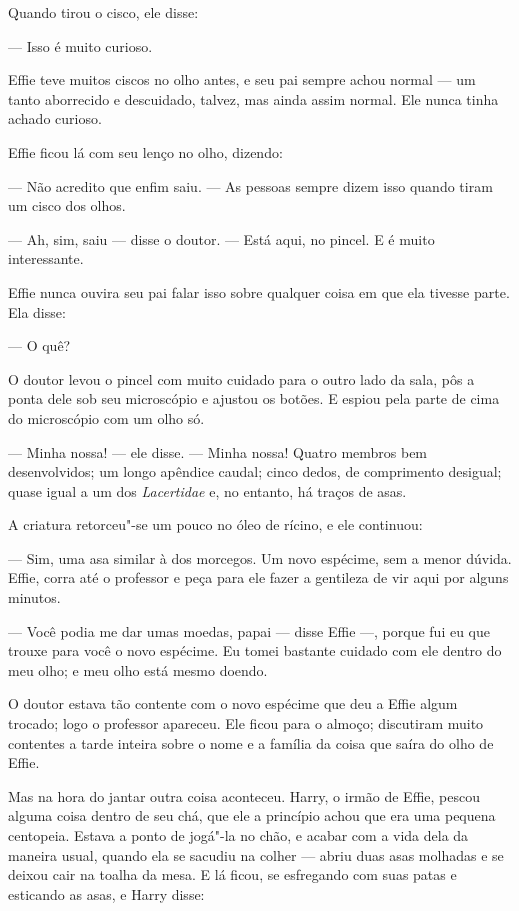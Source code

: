Quando tirou o cisco, ele disse:

--- Isso é muito curioso.

Effie teve muitos ciscos no olho antes, e seu pai sempre
achou normal --- um tanto aborrecido e descuidado, talvez, mas
ainda assim normal. Ele nunca tinha achado curioso.

Effie ficou lá com seu lenço no olho, dizendo:

--- Não acredito que enfim saiu. --- As pessoas sempre dizem isso quando
tiram um cisco dos olhos.

--- Ah, sim, saiu --- disse o doutor. --- Está aqui, no pincel. E é muito
interessante.

Effie nunca ouvira seu pai falar isso sobre qualquer coisa em que ela
tivesse parte. Ela disse:

--- O quê?

O doutor levou o pincel com muito cuidado para o outro lado da sala,
pôs a ponta dele sob seu microscópio e ajustou os botões. E
espiou pela parte de cima do microscópio com um olho só.

--- Minha nossa! --- ele disse. --- Minha nossa! Quatro membros bem
desenvolvidos; um longo apêndice caudal; cinco dedos, de comprimento
desigual; quase igual a um dos \textit{Lacertidae} e, no entanto, há traços de
asas. 

A criatura retorceu"-se um pouco no óleo de rícino, e ele continuou:

--- Sim, uma asa similar à dos morcegos. Um novo espécime, sem a menor
dúvida. Effie, corra até o professor e peça para ele fazer a
gentileza de vir aqui por alguns minutos.

--- Você podia me dar umas moedas, papai --- disse Effie ---, porque fui eu
que trouxe para você o novo espécime. Eu tomei bastante cuidado com
ele dentro do meu olho; e meu olho está mesmo doendo.

O doutor estava tão contente com o novo espécime que deu a Effie
algum trocado; logo o professor apareceu. Ele ficou para o almoço;
discutiram muito contentes a tarde inteira sobre o nome e
a família da coisa que saíra do olho de Effie.

Mas na hora do jantar outra coisa aconteceu. Harry, o irmão de Effie,
pescou alguma coisa dentro de seu chá, que ele a princípio achou que
era uma pequena centopeia. Estava a ponto de jogá"-la no
chão, e acabar com a vida dela da maneira usual, quando ela se
sacudiu na colher --- abriu duas asas molhadas e se deixou cair na
toalha da mesa. E lá ficou, se esfregando com suas patas e esticando
as asas, e Harry disse:

